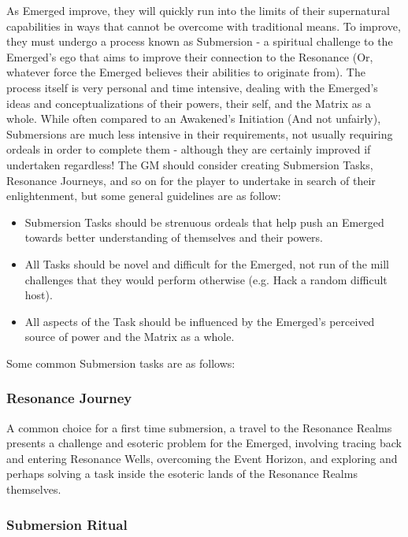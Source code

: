 \begin{multicols*}{3}
	As Emerged improve, they will quickly run into the limits of their supernatural capabilities in ways that cannot be overcome with traditional means. To improve, they must undergo a process known as Submersion - a spiritual challenge to the Emerged's ego that aims to improve their connection to the Resonance (Or, whatever force the Emerged believes their abilities to originate from). The process itself is very personal and time intensive, dealing with the Emerged's ideas and conceptualizations of their powers, their self, and the Matrix as a whole. While often compared to an Awakened's Initiation (And not unfairly), Submersions are much less intensive in their requirements, not usually requiring ordeals in order to complete them - although they are certainly improved if undertaken regardless! The GM should consider creating Submersion Tasks, Resonance Journeys, and so on for the player to undertake in search of their enlightenment, but some general guidelines are as follow:
	
	\begin{itemize}
		\itemsep 0pt
		\item Submersion Tasks should be strenuous ordeals that help push an Emerged towards better understanding of themselves and their powers.
		\item All Tasks should be novel and difficult for the Emerged, not run of the mill challenges that they would perform otherwise (e.g. Hack a random difficult host).
		\item All aspects of the Task should be influenced by the Emerged's perceived source of power and the Matrix as a whole.
	\end{itemize}

	Some common Submersion tasks are as follows:
	
	\subsubsection*{Resonance Journey}
	
	A common choice for a first time submersion, a travel to the Resonance Realms presents a challenge and esoteric problem for the Emerged, involving tracing back and entering Resonance Wells, overcoming the Event Horizon, and exploring and perhaps solving a task inside the esoteric lands of the Resonance Realms themselves.
	
	\subsubsection*{Submersion Ritual}
	

\end{multicols*}
